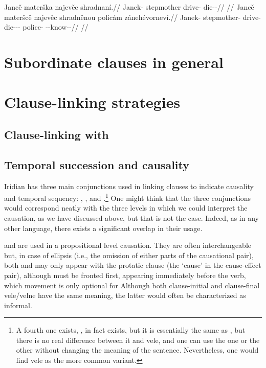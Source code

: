 \pex
\a\begingl
    \gla Jancě materška najevěc shradnan\'i.//
    \glb Janek-\Gen{} stepmother drive-\Cv{} die-\Pv{}-\Ret{}//
    \glft {}//
\endgl
\a\begingl
    \gla Jancě materšcě najevěc shradněnou polic\'am z\'aneh\'evornev\'i.//
    \glb Janek-\Gen{} stepmother-\Gen{} drive-\Cv{} die-\Pv{}-\Ret{}-\Nz{} police-\Agt{} \Neg{}-\Caus{}-know-\Pv{}-\Cont{}//
    \glft {}//
\endgl
\xe

\section{Subordinate clauses in general}


\section{Clause-linking strategies}
\subsection{Clause-linking with }

\subsection{Temporal succession and causality}

Iridian has three main conjunctions used in linking clauses to indicate causality and temporal sequency: , , and .\footnote{A fourth one exists, , in fact exists, but it is essentially the same as , but there is no real difference between it and vele, and one can use the one or the other without changing the meaning of the sentence. Nevertheless, one would find vele as the more common variant.} One might think that the three conjunctions would correspond neatly with the three levels in which we could interpret the causation, as we have discussed above, but that is not the case. Indeed, as in any other language, there exists a significant overlap in their usage.

 and  are used in a propositional level causation. They are often interchangeable but, in case of ellipsis (i.e., the omission of either parts of the causational pair), both  and  may only appear with the protatic clause (the `cause' in the cause-effect pair), although  must be fronted first, appearing immediately before the verb, which movement is only optional for  Although both clause-initial and clause-final vele/velne have the same meaning, the latter would often be characterized as informal.


